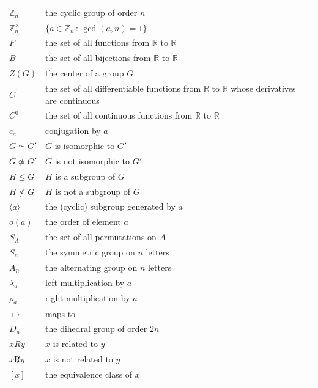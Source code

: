 \documentclass[10pt,openany,oneside]{book}
\theoremstyle{plain}
\theoremstyle{definition}
\theoremstyle{definition}
\theoremstyle{definition}
\theoremstyle{definition}
\numberwithin{equation}{section}
\def\Z{\mathbb{Z}}
\def\R{\mathbb{R}}
\begin{document}
\begin{longtable}[l]{lp{}r}
\(\Z_n\)&the cyclic group of order \(n\)&\pageref{notation-42}\\
\(\Z_n^{\times}\)&\(\{a\in \Z_n\,:\,\gcd(a,n)=1\}\)&\pageref{notation-43}\\
\(F\)&the set of all functions from \(\R\) to \(\R\)&\pageref{notation-44}\\
\(B\)&the set of all bijections from \(\R\) to \(\R\)&\pageref{notation-45}\\
\(Z(G)\)&the center of a group \(G\)&\pageref{notation-46}\\
\(C^1\)&the set of all differentiable functions from \(\R\) to \(\R\) whose derivatives are continuous&\pageref{notation-47}\\
\(C^0\)&the set of all continuous functions from \(\R\) to \(\R\)&\pageref{notation-48}\\
\(c_a\)&conjugation by \(a\)&\pageref{notation-49}\\
\(G\simeq G'\)&\(G\) is isomorphic to \(G'\)&\pageref{notation-50}\\
\(G\not \simeq G'\)&\(G\) is not isomorphic to \(G'\)&\pageref{notation-51}\\
\(H\leq G\)&\(H\) is a subgroup of \(G\)&\pageref{notation-52}\\
\(H\not \leq G\)&\(H\) is not a subgroup of \(G\)&\pageref{notation-53}\\
\(\langle a \rangle\)&the (cyclic) subgroup generated by \(a\)&\pageref{notation-54}\\
\(o(a)\)&the order of element \(a\)&\pageref{notation-55}\\
\(S_A\)&the set of all permutations on \(A\)&\pageref{notation-56}\\
\(S_n\)&the symmetric group on \(n\) letters&\pageref{notation-57}\\
\(A_n\)&the alternating group on \(n\) letters&\pageref{notation-58}\\
\(\lambda_a\)&left multiplication by \(a\)&\pageref{notation-59}\\
\(\rho_a\)&right multiplication by \(a\)&\pageref{notation-60}\\
\(\mapsto\)&maps to&\pageref{notation-61}\\
\(D_n\)&the dihedral group of order \(2n\)&\pageref{notation-62}\\
\(xRy\)&\(x\) is related to \(y\)&\pageref{notation-63}\\
\(x\not R y\)&\(x\) is not related to \(y\)&\pageref{notation-64}\\
\([x]\)&the equivalence class of \(x\)&\pageref{notation-65}\\

\end{longtable}
\end{document}
